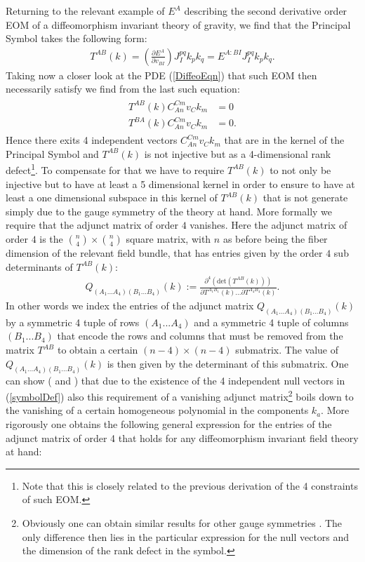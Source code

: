 Returning to the relevant example of $E^A$ describing the second derivative order EOM of a diffeomorphism invariant theory of gravity, we find that the Principal Symbol takes the following form:
\begin{align}
    T^{A B} (k) = \left (\frac{\partial E^A}{\partial v_{BI}} \right )J_I^{pq} k_p k_q = E^{A: BI} J_I^{pq} k_p k_q.
\end{align}
Taking now a closer look at the PDE (\ref{DiffeoEqn}) that such EOM then necessarily  satisfy we find from the last such equation:
\begin{align}\label{symbolDef}
\begin{aligned}
    T^{A B} (k) C_{An}^{Cm}v_Ck_m &= 0 \\
    T^{B A} (k) C_{An}^{Cm}v_Ck_m &= 0 .
\end{aligned}
\end{align}
Hence there exits 4 independent vectors $C_{An}^{Cm}v_Ck_m$ that are in the kernel of the Principal Symbol and $T^{AB}(k)$ is not injective but as a 4-dimensional rank defect\footnote{Note that this is closely related to the previous derivation of the 4 constraints of such EOM.}. To compensate for that we have to require $T^{AB}(k)$ to not only be injective but to have at least a 5 dimensional kernel in order to ensure to have at least a one dimensional subspace in this kernel of $T^{AB}(k)$ that is not generate simply due to the gauge symmetry of the theory at hand. More formally we require that the adjunct matrix of order $4$ vanishes. Here the adjunct matrix of order $4$ is the $\binom{n}{4} \times \binom{n}{4}$ square matrix, with $n$ as before being the fiber dimension of the relevant field bundle, that has entries given by the order $4$ sub determinants of $T^{AB}(k)$:
\begin{align}\label{MinorDef}
    Q_{(A_1...A_4) (B_1...B_4)}(k) := \frac{\partial^4 (\mathrm{det}(T^{AB}(k)))}{\partial T^{A_1 B_1}(k) ... \partial T^{A_4 B_4}(k)}.
\end{align}
In other words we index the entries of the adjunct matrix $Q_{(A_1...A_4) (B_1...B_4)}(k)$ by a symmetric 4 tuple of rows $(A_1...A_4)$ and a symmetric 4 tuple of columns $(B_1...B_4)$ that encode the rows and columns that must be removed from the matrix $T^{AB}$ to obtain a certain $(n-4) \times (n-4)$ submatrix. The value of $Q_{(A_1...A_4) (B_1...B_4)}(k)$ is then given by the determinant of this submatrix. 
%
%
%
One can show (\cite{2018PhRvD..97h4036D} and \cite{2009JPhA...42U5402I}) that due to the existence of the 4 independent null vectors in (\ref{symbolDef}) also this requirement of a vanishing adjunct matrix\footnote{Obviously one can obtain similar results for other gauge symmetries \cite{2018PhRvD..97h4036D}. The only difference then lies in the particular expression for the null vectors and the dimension of the rank defect in the symbol.} boils down to the vanishing of a certain homogeneous polynomial in the components $k_a$. More rigorously one obtains the following general expression for the entries of the adjunct matrix of order 4 that holds for any diffeomorphism invariant field theory at hand:
